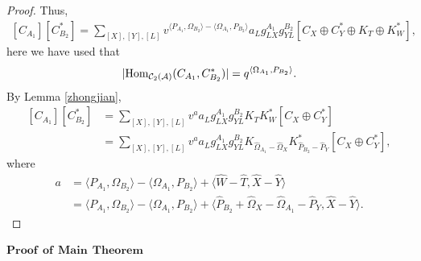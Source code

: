 \documentclass[reqno,12pt]{amsart}
\numberwithin{equation}{section}
\def\lr#1{\langle #1\rangle} \def\fin{\hfill$\square$}  \def\lra{\longrightarrow} \def\Tor{\mbox{\rm Tor}\,}
\theoremstyle{plain} %
\theoremstyle{definition} %
\begin{document}
\begin{proof}
Thus, \begin{equation*}\begin{split}
[C_{A_1}][C_{B_2}^\ast]=\sum_{[X],[Y],[L]}v^{\lr{P_{A_1},\Omega_{B_2}}-\lr{\Omega_{A_1},P_{B_2}}}a_Lg_{LX}^{A_1}g_{YL}^{B_2}
[C_X\oplus C_Y^\ast\oplus K_T\oplus K_W^\ast],
\end{split}\end{equation*}
here we have used that $$|\Hom_{\mathcal{C}_2(\mathcal{A})}(C_{A_1},C_{B_2}^\ast)|=q^{\lr{\Omega_{A_1},P_{B_2}}}.$$
By Lemma \ref{zhongjian},
\begin{equation*}\begin{split}
[C_{A_1}][C_{B_2}^\ast]&=\sum_{[X],[Y],[L]}v^{a}a_Lg_{LX}^{A_1}g_{YL}^{B_2}K_TK_W^\ast[C_X\oplus C_Y^\ast]\\
&=\sum_{[X],[Y],[L]}v^{a}a_Lg_{LX}^{A_1}g_{YL}^{B_2}K_{\hat{\Omega}_{A_1}-\hat{\Omega}_X}K_{\hat{P}_{B_2}-\hat{P}_Y}^\ast[C_X\oplus C_Y^\ast],
\end{split}\end{equation*}
where \begin{equation*}\begin{split}
a&=\lr{P_{A_1},\Omega_{B_2}}-\lr{\Omega_{A_1},P_{B_2}}+\lr{\hat{W}-\hat{T},\hat{X}-\hat{Y}}\\
&=\lr{P_{A_1},\Omega_{B_2}}-\lr{\Omega_{A_1},P_{B_2}}+\lr{\hat{P}_{B_2}+\hat{\Omega}_X-\hat{\Omega}_{A_1}-\hat{P}_Y,\hat{X}-\hat{Y}}.
\end{split}\end{equation*}
\end{proof}

\noindent$\mathbf{Proof~~of~~Main~~Theorem}$~~~~
\end{document}

